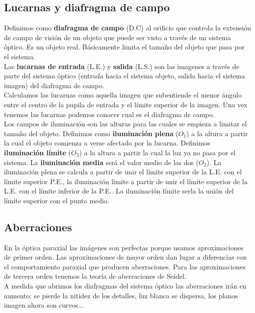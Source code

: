\documentclass[12pt]{article}
\numberwithin{equation}{section}
\numberwithin{figure}{section}
\begin{document}
\subsection{Lucarnas y diafragma de campo}

Definimos como \textbf{diafragma de campo} (D.C) al orificio que controla la extensión de campo de visión de un objeto que puede ser visto a través de un sistema óptico. Es un objeto real. Básicamente limita el tamaño del objeto que pasa por el sistema. \\

Las \textbf{lucarnas de entrada} (L.E.) y \textbf{salida} (L.S.) son las imagenes a través de parte del sistema óptico (entrada hacia el sistema objeto, salida hacia el sistema imagen) del diafragma de campo. \\

Calculamos las lucarnas como aquella imagen que subentiende el menor ángulo entre el centro de la pupila de entrada y el límite superior de la imagen. Una vez tenemos las lucarnas podemos conocer cual es el diafragma de campo. \\

Los campos de iluminación son las alturas para las cuales se empieza a limitar el tamaño del objeto. Definimos como \textbf{iluminación plena} ($O_1$) a la altura a partir la cual el objeto comienza a verse afectado por la lucarna. Definimos \textbf{iluminación límite} ($O_3$) a la altura a partir la cual la luz ya no pasa por el sistema. La \textbf{iluminación media} será el valor medio de las dos ($O_2$). La iluminación plena se calcula a partir de unir el límite superior de la L.E. con el límite superior P.E., la iluminación límite a partir de unir el límite superior de la L.E. con el límite inferior de la P.E.. La iluminación límite serla la unión del límite superior con el punto medio.

\subsection{Aberraciones}

En la óptica paraxial las imágenes son perfectas porque usamos aproximaciones de primer orden. Las aproximaciones de mayor orden dan lugar a diferencias con el comportamiento paraxial que producen aberraciones. Para las aproximaciones de tercera orden tenemos la teoría de aberraciones de Seidel. \\

A medida que abrimos los diafragmas del sistema óptico las aberraciones irán en aumento: se pierde la nitidez de los detalles, luz blanca se dispersa, los planos imagen ahora son curvos... \\
\end{document}

